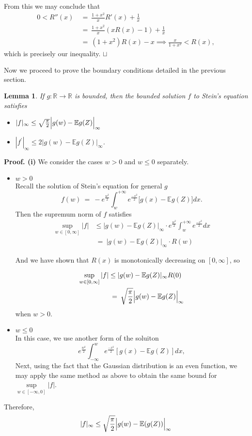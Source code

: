 \documentclass[12pt]{article}
\newcommand\qed{\hfill\hbox{\rlap{$\sqcap$}$\sqcup$}}
\newcommand{\eq }{\: = \:}
\newtheorem{lemma}{Lemma}
\theoremstyle{nonumberplain}
\begin{document}
From this we may conclude that
\begin{align*}
0 < R''(x) &\eq \frac{1 + x^2}{x}R'(x) + \frac{1}{x} \\
&\eq \frac{1 + x^2}{x}(xR(x) - 1) + \frac{1}{x} \\
&\eq (1 + x^2)R(x) - x
\implies \frac{x}{1 + x^2} < R(x),
\end{align*}
which is precisely our inequality.
\qed

Now we proceed to prove the boundary conditions detailed in the previous section.
\begin{lemma}
If $g:\mathbb{R}\rightarrow \mathbb{R}$ is bounded, then the bounded solution $f$ to Stein's equation satisfies
\begin{itemize}
\item [(i)] $|f|_{\infty}\leq \sqrt{\frac{\pi}{2}}\Bigl|g(w)-\mathbb{E}g(Z)\Bigr|_{\infty}$

\item [(ii)] $|f^{\prime}|_{\infty} \leq 2|g(w)-\mathbb{E}g(Z)|_{\infty}$.
\end{itemize}
\end{lemma}
\textbf{Proof. (i)} We consider the cases $w>0$ and $w\leq 0$ separately.
\begin{itemize}
\item [Case 1] $w>0$\\
Recall the solution of Stein's equation for general $g$
$$
f(w)\eq -e^{\frac{w^{2}}{2}} \int_{w}^{+\infty} e^{\frac{-x^{2}}{2}}\bigl[g(x)-\mathbb{E}g(Z)\bigr]dx.
$$
Then the supremum norm of $f$ satisfies
\begin{align*}
\sup \limits_{w \in [0, \infty]} |f| &\leq |g(w)-\mathbb{E}g(Z)|_{\infty} \cdot e^{\frac{w^{2}}{2}} \int_{w}^{+\infty} e^{\frac{-x^{2}}{2}}dx \\
& \eq |g(w)-\mathbb{E}g(Z)|_{\infty} \cdot R(w)
\end{align*}

And we have shown that $R(x)$ is monotonically decreasing on $[0, \infty]$, so

\begin{align*}
\sup \limits_{w \in [0, \infty]} |f| &\leq |g(w)-\mathbb{E}g(Z)|_{\infty}R(0) \\
&\eq \sqrt{\frac{\pi}{2}}\Bigl|g(w)-\mathbb{E}g(Z)\Bigr|_{\infty}
\end{align*}
when $w>0$.
\item[b.] $w\leq 0$ \\
In this case, we use another form of the soluiton
$$
e^{\frac{w^{2}}{2}} \int_{-\infty}^{w} e^{\frac{-x^{2}}{2}}[g(x)-\mathbb{E}g(Z)]dx,
$$
Next, using the fact that the Gaussian distribution is an even function, we may apply the same method as above to obtain the same bound for $\sup \limits_{w \in [- \infty, 0]} |f|$.
\end{itemize}
Therefore,
$$
|f|_{\infty} \leq \sqrt{\frac{\pi}{2}}\Bigl|g(w)-\mathbb{E}(g(Z))\Bigr|_{\infty}
$$
\end{document}

